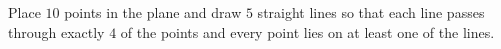 Place $10$ points in the plane and draw $5$ straight lines so that each line passes through exactly $4$ of the points and every point lies on at least one of the lines.
